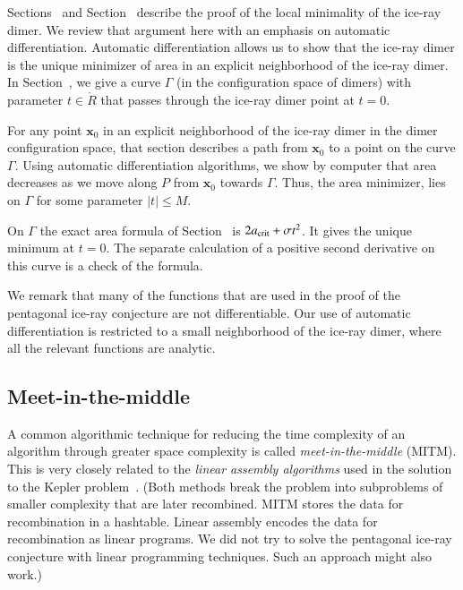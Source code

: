 Sections~ and Section~ describe
the proof of the local minimality of the ice-ray dimer.  We review
that argument here with an emphasis on automatic differentiation.
Automatic differentiation allows us to show that the ice-ray dimer is
the unique minimizer of area in an explicit neighborhood of the
ice-ray dimer.  In Section~, we give a curve
$\Gamma$ (in the configuration space of dimers) with parameter
$t\in\ring{R}$ that passes through the ice-ray dimer point at $t=0$.

For any point $\mathbf{x}_0$ in an explicit neighborhood of the ice-ray dimer
in the dimer configuration space, that section describes a path from
$\mathbf{x}_0$ to a point on the curve $\Gamma$.  Using automatic
differentiation algorithms, we show by computer that area decreases as
we move along $P$ from $\mathbf{x}_0$ towards $\Gamma$.  Thus, the area
minimizer, lies on $\Gamma$ for some parameter $|t|\le M$.

On $\Gamma$ the exact area formula of Section~
is $2a_\text{crit}+\sigma t^2$. It gives the unique minimum at $t=0$.
The separate calculation of a positive second derivative on this curve
is a check of the formula.

We remark that many of the functions that are used in the proof of the
pentagonal ice-ray conjecture are not differentiable.  Our use of
automatic differentiation is restricted to a small neighborhood of the
ice-ray dimer, where all the relevant functions are analytic.

\subsection{Meet-in-the-middle}

A common algorithmic technique for reducing the time complexity of an
algorithm through greater space complexity is called {\it
  meet-in-the-middle} (MITM).  This is very closely related to the
{\it linear assembly algorithms} used in the solution to the Kepler
problem~\cite{hales2003some}. (Both methods break the problem into
subproblems of smaller complexity that are later recombined.  MITM
stores the data for recombination in a hashtable.  Linear assembly
encodes the data for recombination as linear programs.  We did not
try to solve the pentagonal ice-ray conjecture with linear programming
techniques. Such an approach might also work.)


